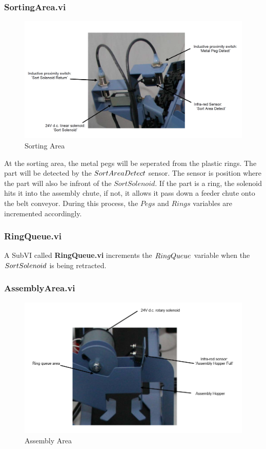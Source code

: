 \documentclass[12pt]{article}
\begin{document}
  \subsubsection{SortingArea.vi}
    \begin{figure}[H]
      \centering
      \includegraphics[width=\linewidth]{images/sorting-area.png}
      \caption{Sorting Area\cite{ictmanual}}
    \end{figure}

    At the sorting area, the metal pegs will be sep\-erated
    from the plastic rings. The part will be detected by the $Sort\-Area\-Detect$ 
    sensor. The sensor is position where the part will also be infront of the 
    $SortSolenoid$. If the part is a ring, the solenoid hits it into the 
    assembly chute, if not, it allows it pass down a feeder chute onto the belt
    conveyor. During this process, the $Pegs$ and $Rings$ variables are incremented accordingly.

  \subsubsection{RingQueue.vi}
    A SubVI called \textbf{Ring\-Queue.vi} increments the $Ring\-Queue$ 
    variable when the $Sort\-Solenoid$ is being retracted.

  \subsubsection{AssemblyArea.vi}
    \begin{figure}[H]
      \centering
      \includegraphics[width=\linewidth]{images/assembly-area.png}
      \caption{Assembly Area\cite{ictmanual}}
    \end{figure}
\end{document}
